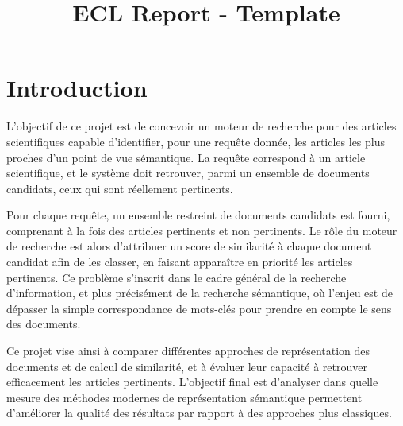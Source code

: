 \documentclass{rapportECL}
\title{ECL Report - Template} %
\begin{document}





\fairemarges %
\fairepagedegarde %
\tabledematieres %


\section{Introduction}

L’objectif de ce projet est de concevoir un moteur de recherche pour des articles scientifiques capable d’identifier, pour une requête donnée, les articles les plus proches d’un point de vue sémantique. La requête correspond à un article scientifique, et le système doit retrouver, parmi un ensemble de documents candidats, ceux qui sont réellement pertinents.

Pour chaque requête, un ensemble restreint de documents candidats est fourni, comprenant à la fois des articles pertinents et non pertinents. Le rôle du moteur de recherche est alors d’attribuer un score de similarité à chaque document candidat afin de les classer, en faisant apparaître en priorité les articles pertinents. Ce problème s’inscrit dans le cadre général de la recherche d’information, et plus précisément de la recherche sémantique, où l’enjeu est de dépasser la simple correspondance de mots-clés pour prendre en compte le sens des documents.

Ce projet vise ainsi à comparer différentes approches de représentation des documents et de calcul de similarité, et à évaluer leur capacité à retrouver efficacement les articles pertinents. L’objectif final est d’analyser dans quelle mesure des méthodes modernes de représentation sémantique permettent d’améliorer la qualité des résultats par rapport à des approches plus classiques.
\end{document}

